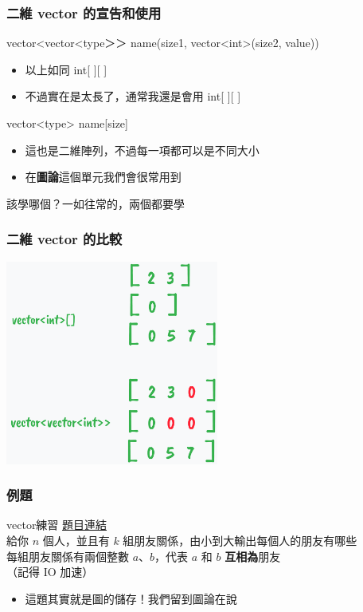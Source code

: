 \documentclass[mathserif]{beamer}
\begin{document}
\begin{frame}
    \frametitle{二維 vector 的宣告和使用}
    vector<vector<{\color[rgb]{1,0,0}type}＞＞ {\color[rgb]{1,0,0}name}({\color[rgb]{1,0,0}size1}, vector<int>({\color[rgb]{1,0,0}size2}, {\color[rgb]{1,0,0}value}))
    \begin{itemize}
        \item 以上如同 int[ ][ ]
        \item 不過實在是太長了，通常我還是會用 int[ ][ ]
    \end{itemize}
    \vspace{0.5cm}
    vector<{\color[rgb]{1,0,0}type}> {\color[rgb]{1,0,0}name}[{\color[rgb]{1,0,0}size}]
    \begin{itemize}
        \item 這也是二維陣列，不過每一項都可以是不同大小
        \item 在\textbf{圖論}這個單元我們會很常用到
    \end{itemize}
    \vspace{0.5cm}
    該學哪個？一如往常的，兩個都要學
\end{frame}

\begin{frame}
    \frametitle{二維 vector 的比較}
    \vspace{0.5cm}
    \includegraphics[width=7.0cm]{img/3-4.png}
\end{frame}

\begin{frame}
    \frametitle{例題}
    \begin{block}{vector練習}
        \href{https://toj.tfcis.org/oj/pro/575/}{題目連結}\\
        給你 $n$ 個人，並且有 $k$ 組朋友關係，由小到大輸出每個人的朋友有哪些\\
        每組朋友關係有兩個整數 $a$、$b$，代表 $a$ 和 $b$ \textbf{互相為}朋友\\
        （記得 IO 加速）
    \end{block}
    \begin{itemize}
        \item<2-> 這題其實就是圖的儲存！我們留到圖論在說
    \end{itemize}
\end{frame}
\end{document}
